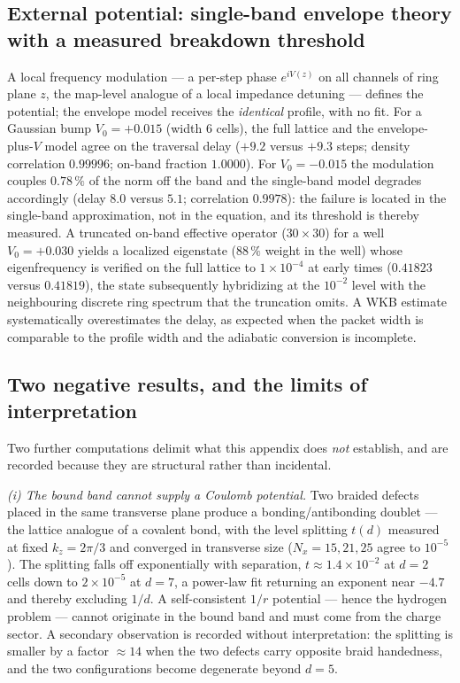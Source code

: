 \documentclass[11pt,a4paper]{article}
\theoremstyle{plain}
\theoremstyle{remark}
\begin{document}
\subsection{External potential: single-band envelope theory with a measured breakdown threshold}
A local frequency modulation --- a per-step phase $e^{iV(z)}$ on all channels of ring plane $z$, the map-level analogue of a local impedance detuning --- defines the potential; the envelope model receives the \emph{identical} profile, with no fit. For a Gaussian bump $V_0 = +0.015$ (width 6 cells), the full lattice and the envelope-plus-$V$ model agree on the traversal delay ($+9.2$ versus $+9.3$ steps; density correlation $0.99996$; on-band fraction $1.0000$). For $V_0 = -0.015$ the modulation couples $0.78\,\%$ of the norm off the band and the single-band model degrades accordingly (delay $8.0$ versus $5.1$; correlation $0.9978$): the failure is located in the single-band approximation, not in the equation, and its threshold is thereby measured. A truncated on-band effective operator ($30\times30$) for a well $V_0 = +0.030$ yields a localized eigenstate ($88\,\%$ weight in the well) whose eigenfrequency is verified on the full lattice to $1\times10^{-4}$ at early times ($0.41823$ versus $0.41819$), the state subsequently hybridizing at the $10^{-2}$ level with the neighbouring discrete ring spectrum that the truncation omits. A WKB estimate systematically overestimates the delay, as expected when the packet width is comparable to the profile width and the adiabatic conversion is incomplete.

\subsection{Two negative results, and the limits of interpretation}
Two further computations delimit what this appendix does \emph{not} establish, and are recorded because they are structural rather than incidental.

\emph{(i) The bound band cannot supply a Coulomb potential.} Two braided defects placed in the same transverse plane produce a bonding/antibonding doublet --- the lattice analogue of a covalent bond, with the level splitting $t(d)$ measured at fixed $k_z = 2\pi/3$ and converged in transverse size ($N_x = 15, 21, 25$ agree to $10^{-5}$). The splitting falls off exponentially with separation, $t \approx 1.4\times10^{-2}$ at $d = 2$ cells down to $2\times10^{-5}$ at $d = 7$, a power-law fit returning an exponent near $-4.7$ and thereby excluding $1/d$. A self-consistent $1/r$ potential --- hence the hydrogen problem --- cannot originate in the bound band and must come from the charge sector. A secondary observation is recorded without interpretation: the splitting is smaller by a factor $\approx 14$ when the two defects carry opposite braid handedness, and the two configurations become degenerate beyond $d = 5$.
\end{document}
